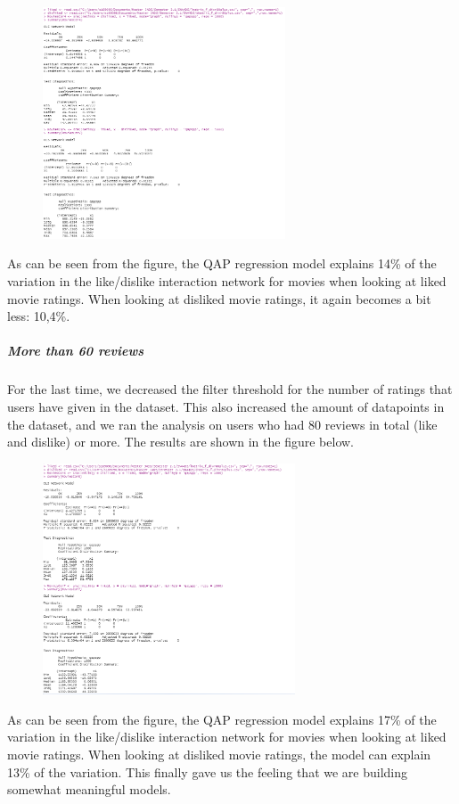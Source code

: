 \documentclass[
  english,
  man,floatsintext]{apa6}
\let\oldsubparagraph\subparagraph
\renewcommand{\subparagraph}[1]{\oldsubparagraph{#1}\mbox{}}
\begin{document}
\begin{figure}
\includegraphics[width=2.83in]{results80plus} \caption{ }\label{fig:unnamed-chunk-9}
\end{figure}

As can be seen from the figure, the QAP regression model explains 14\% of the variation in the like/dislike interaction network for movies when looking at liked movie ratings. When looking at disliked movie ratings, it again becomes a bit less: 10,4\%.

\hypertarget{more-than-60-reviews}{%
\subparagraph{More than 60 reviews}\label{more-than-60-reviews}}

For the last time, we decreased the filter threshold for the number of ratings that users have given in the dataset. This also increased the amount of datapoints in the dataset, and we ran the analysis on users who had 80 reviews in total (like and dislike) or more. The results are shown in the figure below.

\begin{figure}
\includegraphics[width=2.95in]{results60plus} \caption{ }\label{fig:unnamed-chunk-10}
\end{figure}

As can be seen from the figure, the QAP regression model explains 17\% of the variation in the like/dislike interaction network for movies when looking at liked movie ratings. When looking at disliked movie ratings, the model can explain 13\% of the variation. This finally gave us the feeling that we are building somewhat meaningful models.
\end{document}
